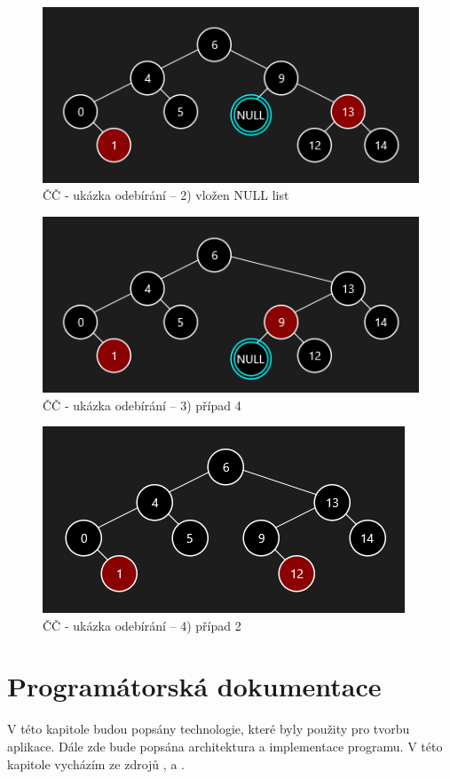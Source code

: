\documentclass[
  biblatex=false,
  font=serif,
  glossaries=false,
  tables=false,
  theorems=false,
  index
]{kidiplom}
\begin{document}
\begin{figure}[h!]
\centering
	\includegraphics[scale=0.8]{obrazky/31CCMazani.png}
	\caption{ČČ - ukázka odebírání -- 2) vložen NULL list}
\end{figure}

\begin{figure}[h!]
\centering
	\includegraphics[scale=0.8]{obrazky/32CCMazani.png}
	\caption{ČČ - ukázka odebírání -- 3) případ 4}
\end{figure}

\begin{figure}[h!]
\centering
	\includegraphics[scale=0.8]{obrazky/33CCMazani.png}
	\caption{ČČ - ukázka odebírání -- 4) případ 2}
\end{figure}

\newpage
\section{Programátorská dokumentace}
\indent\indent V této kapitole budou popsány technologie, které byly použity pro tvorbu aplikace. Dále zde bude popsána architektura a implementace programu. V této kapitole vycházím ze zdrojů \cite{oracle}, \cite{java} a \cite{javafx}.
\end{document}
